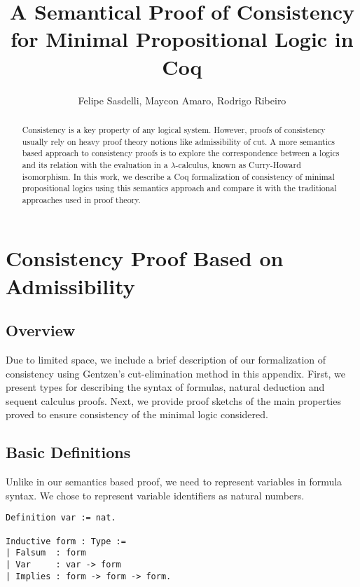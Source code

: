 \documentclass[12pt]{article}
\title{A Semantical Proof of Consistency for Minimal Propositional Logic in Coq}
\author{Felipe Sasdelli\inst{1}, Maycon Amaro\inst{1}, Rodrigo Ribeiro\inst{1}}
\theoremstyle{definition}
\begin{document}
 

\maketitle

\begin{abstract}
  Consistency is a key property of any logical system. However, proofs of
  consistency usually rely on heavy proof theory notions like admissibility
  of cut. A more semantics based approach to consistency proofs is to explore the
  correspondence between a logics and its relation with the
  evaluation in a $\lambda$-calculus, known as Curry-Howard isomorphism.
  In this work, we describe a Coq formalization of consistency of minimal
  propositional logics using this semantics approach and compare it with 
  the traditional approaches used in proof theory.
\end{abstract}






\appendix

\section{Consistency Proof Based on Admissibility}

\subsection{Overview}

Due to limited space, we include a brief description of our formalization of
consistency using Gentzen's cut-elimination method in this appendix. First, we
present types for describing the syntax of formulas, natural deduction
and sequent calculus proofs. Next, we provide proof sketchs of the main
properties proved to ensure consistency of the minimal logic considered.

\subsection{Basic Definitions}

Unlike in our semantics based proof, we need to represent variables in
formula syntax. We chose to represent variable identifiers as natural
numbers.

\begin{lstlisting}
Definition var := nat.

Inductive form : Type :=
| Falsum  : form 
| Var     : var -> form
| Implies : form -> form -> form.
\end{lstlisting}
\end{document}
